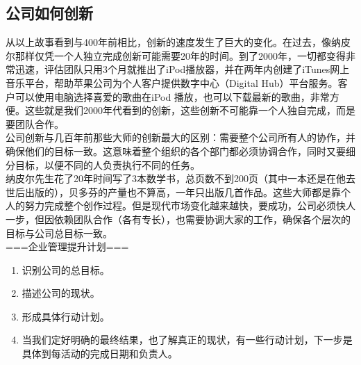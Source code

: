 \hypertarget{ux516cux53f8ux5982ux4f55ux521bux65b0}{%
\subsection{公司如何创新}\label{ux516cux53f8ux5982ux4f55ux521bux65b0}}

从以上故事看到与400年前相比，创新的速度发生了巨大的变化。在过去，像纳皮尔那样仅凭一个人独立完成创新可能需要20年的时间。到了2000年，一切都变得非常迅速，评估团队只用3个月就推出了iPod播放器，并在两年内创建了iTunes网上音乐平台，帮助苹果公司为个人客户提供数字中心（Digital
Hub）平台服务。客户可以使用电脑选择喜爱的歌曲在iPod
播放，也可以下载最新的歌曲，非常方便。这些就是我们2000年代看到的创新，这些创新不可能靠一个人独自完成，而是要团队合作。\\
公司创新与几百年前那些大师的创新最大的区别：需要整个公司所有人的协作，并确保他们的目标一致。这意味着整个组织的各个部门都必须协调合作，同时又要细分目标，以便不同的人负责执行不同的任务。\\
纳皮尔先生花了20年时间写了3本数学书，总页数不到200页（其中一本还是在他去世后出版的），贝多芬的产量也不算高，一年只出版几首作品。这些大师都是靠个人的努力完成整个创作过程。但是现代市场变化越来越快，要成功，公司必须快人一步，但因依赖团队合作（各有专长），也需要协调大家的工作，确保各个层次的目标与公司总目标一致。\\
===企业管理提升计划===

\begin{enumerate}
\tightlist
\item
  识别公司的总目标。

\item
  描述公司的现状。

\item
  形成具体行动计划。

\item
  当我们定好明确的最终结果，也了解真正的现状，有一些行动计划，下一步是具体到每活动的完成日期和负责人。
\end{enumerate}

